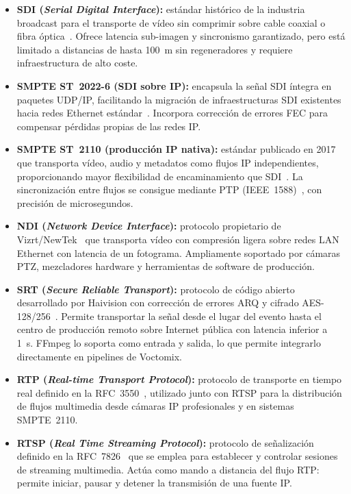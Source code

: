 \begin{itemize}
  \item \textbf{SDI (\textit{Serial Digital Interface}):} estándar histórico de la
  industria broadcast para el transporte de vídeo sin comprimir sobre cable coaxial o
  fibra óptica~\cite{smpte_sdi}. Ofrece latencia sub-imagen y sincronismo garantizado,
  pero está limitado a distancias de hasta 100~m sin regeneradores y requiere
  infraestructura de alto coste.

  \item \textbf{SMPTE ST~2022-6 (SDI sobre IP):} encapsula la señal SDI íntegra en
  paquetes UDP/IP, facilitando la migración de infraestructuras SDI existentes hacia
  redes Ethernet estándar~\cite{smpte_st2022_6}. Incorpora corrección de errores FEC
  para compensar pérdidas propias de las redes IP.

  \item \textbf{SMPTE ST~2110 (producción IP nativa):} estándar publicado en 2017 que
  transporta vídeo, audio y metadatos como flujos IP independientes, proporcionando
  mayor flexibilidad de encaminamiento que SDI~\cite{smpte_st2110_20}. La sincronización
  entre flujos se consigue mediante PTP (IEEE~1588)~\cite{ieee1588_ptp}, con precisión
  de microsegundos.

  \item \textbf{NDI (\textit{Network Device Interface}):} protocolo propietario de
  Vizrt/NewTek~\cite{ndi_vizrt} que transporta vídeo con compresión ligera sobre redes
  LAN Ethernet con latencia de un fotograma. Ampliamente soportado por cámaras PTZ,
  mezcladores hardware y herramientas de software de producción.

  \item \textbf{SRT (\textit{Secure Reliable Transport}):} protocolo de código abierto
  desarrollado por Haivision con corrección de errores ARQ y cifrado AES-128/256~\cite{sharabayko2024_srt}.
  Permite transportar la señal desde el lugar del evento hasta el centro de producción
  remoto sobre Internet pública con latencia inferior a 1~s. FFmpeg lo soporta como
  entrada y salida, lo que permite integrarlo directamente en pipelines de Voctomix.

  \item \textbf{RTP (\textit{Real-time Transport Protocol}):} protocolo de transporte
  en tiempo real definido en la RFC~3550~\cite{rfc3550_rtp}, utilizado junto con RTSP
  para la distribución de flujos multimedia desde cámaras IP profesionales y en sistemas
  SMPTE~2110.

  \item \textbf{RTSP (\textit{Real Time Streaming Protocol}):} protocolo de señalización
  definido en la RFC~7826~\cite{rfc7826_rtsp} que se emplea para establecer y controlar
  sesiones de streaming multimedia. Actúa como mando a distancia del flujo RTP: permite
  iniciar, pausar y detener la transmisión de una fuente IP.
\end{itemize}

